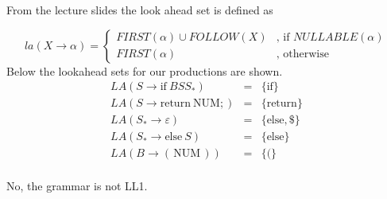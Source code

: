 \documentclass[11pt,a4paper]{article}
\begin{document}
From the lecture slides the look ahead set is defined as

$$la(X\rightarrow\alpha)=
\begin{cases}
    FIRST(\alpha)\cup FOLLOW(X) & \textrm{, if }NULLABLE(\alpha)\\
    FIRST(\alpha)               & \textrm{, otherwise}
\end{cases}$$
Below the lookahead sets for our productions are shown.
$$
\begin{array}{lcl}
    LA(S   \rightarrow  \mathrm{if\:}BSS_*)     & = &      \{\mathrm{if}\} \\
    LA(S   \rightarrow  \mathrm{return\:NUM;})  & = &      \{\mathrm{return}\} \\
    LA(S_* \rightarrow  \varepsilon)            & = &      \{\mathrm{else,} \$\} \\
    LA(S_* \rightarrow  \mathrm{else}\:S)       & = &      \{\mathrm{else}\} \\
    LA(B   \rightarrow  \mathrm{(\,NUM\,)})     & = &      \{\mathrm{(}\} \\
\end{array}
$$

No, the grammar is not LL1.
\end{document}
